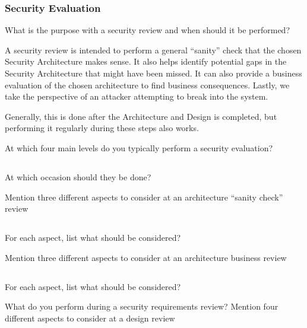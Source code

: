 \section{Security Evaluation}\label{sec:Security_Evaluation}
\begin{questions}
\question{} What is the purpose with a security review and when should it be performed?
  \begin{solution}
    A security review is intended to perform a general ``sanity'' check that the chosen Security Architecture makes sense.
    It also helps identify potential gaps in the Security Architecture that might have been missed.
    It can also provide a business evaluation of the chosen architecture to find business consequences.
    Lastly, we take the perspective of an attacker attempting to break into the system.

    Generally, this is done after the Architecture and Design is completed, but performing it regularly during these steps also works.
  \end{solution}

\question{} At which four main levels do you typically perform a security evaluation?
  \begin{parts}
  \part{} At which occasion should they be done?
  \end{parts}

\question{} Mention three different aspects to consider at an architecture ``sanity check'' review
  \begin{parts}
  \part{} For each aspect, list what should be considered?
  \end{parts}

\question{} Mention three different aspects to consider at an architecture business review
  \begin{parts}
  \part{} For each aspect, list what should be considered?
  \end{parts}

\question{} What do you perform during a security requirements review?
\question{} Mention four different aspects to consider at a design review
  \begin{parts}

\end{parts}
\end{questions}
